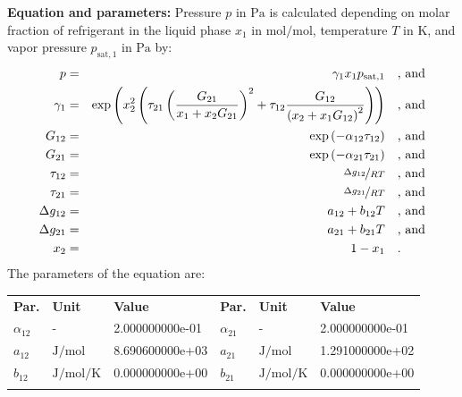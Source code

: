 \textbf{Equation and parameters:}
\newline
%
Pressure $p$ in $\si{\pascal}$ is calculated depending on molar fraction of refrigerant in the liquid phase $x_1$ in $\si{\mole\per\mole}$, temperature $T$ in $\si{\kelvin}$, and vapor pressure $p_\mathrm{sat,1}$ in $\si{\pascal}$ by:
%
\begin{equation*}
\begin{split}
p &=& \gamma_1 x_1 p_\mathrm{sat,1} & \quad\text{, and} \\
\gamma_1 &=& \exp \left( x_2^2 \left( \tau_{21} \left( \frac{G_{21}}{x_1 + x_2 G_{21}} \right) ^2 + \tau_{12} \frac{G_{12}}{\left( x_2 + x_1 G_{12} \right) ^2}\right) \right) & \quad\text{, and} \\
G_{12} &=& \exp \left( -\alpha_{12} \tau_{12} \right) & \quad\text{, and} \\
G_{21} &=& \exp \left( -\alpha_{21} \tau_{21} \right) & \quad\text{, and} \\
\tau_{12} &=& \nicefrac{\Delta g_{12}}{R T} & \quad\text{, and} \\
\tau_{21} &=& \nicefrac{\Delta g_{21}}{R T} & \quad\text{, and} \\
\Delta g_{12} &=& a_{12} + b_{12} T & \quad\text{, and} \\
\Delta g_{21} &=& a_{21} + b_{21} T & \quad\text{, and} \\
x_2 &=& 1 - x_1  & \quad\text{.} \\
\end{split}
\end{equation*}
%
The parameters of the equation are:
%
\begin{longtable}[l]{lll|lll}
\toprule
\addlinespace
\textbf{Par.} & \textbf{Unit} & \textbf{Value} &	\textbf{Par.} & \textbf{Unit} & \textbf{Value} \\
\addlinespace
\midrule
\endhead

\bottomrule
\endfoot
\bottomrule
\endlastfoot
\addlinespace

$\alpha_{12}$ & - & 2.000000000e-01 & $\alpha_{21}$ & - & 2.000000000e-01 \\
$a_{12}$ & $\si{\joule\per\mole}$ & 8.690600000e+03 & $a_{21}$ & $\si{\joule\per\mole}$ & 1.291000000e+02 \\
$b_{12}$ & $\si{\joule\per\mole\per\kelvin}$ & 0.000000000e+00 & $b_{21}$ & $\si{\joule\per\mole\per\kelvin}$ & 0.000000000e+00 \\

\addlinespace\end{longtable}

